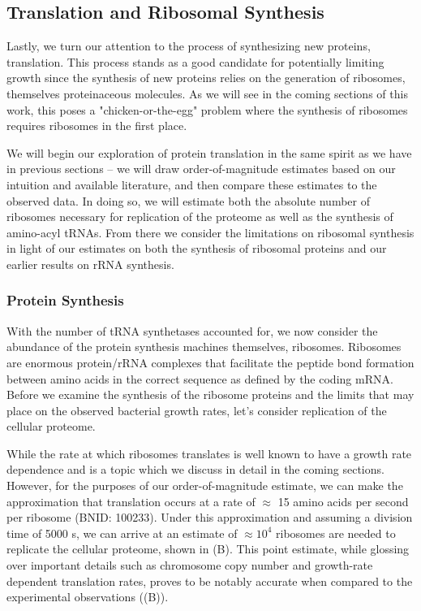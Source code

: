 \subsection{Translation and Ribosomal Synthesis}
Lastly, we turn our attention to the process of synthesizing new proteins,
translation. This process stands as a good candidate for potentially limiting
growth since the synthesis of new proteins relies on the generation of
ribosomes, themselves proteinaceous molecules. As we will see in the coming
sections of this work, this poses a "chicken-or-the-egg" problem where the
synthesis of ribosomes requires ribosomes in the first place.

We will begin our exploration of protein translation in the same spirit as we
have in previous sections -- we will draw order-of-magnitude estimates based
on our intuition and available literature, and then compare these estimates
to the observed data. In doing so, we will estimate both the absolute number
of ribosomes necessary for replication of the proteome as well as the
synthesis of amino-acyl tRNAs. From there we consider the limitations on
ribosomal synthesis in light of our estimates on both the synthesis of
ribosomal proteins and our earlier results on rRNA synthesis.

\subsubsection{Protein Synthesis}
With the number of tRNA synthetases accounted for, we now consider the abundance
of the protein synthesis machines themselves, ribosomes. Ribosomes are enormous
protein/rRNA complexes that facilitate the peptide bond formation between amino
acids in the correct sequence as defined by the coding mRNA. Before we examine
the synthesis of the ribosome proteins and the limits that may place on the
observed bacterial growth rates, let's consider replication of the cellular
proteome.

While the rate at which ribosomes translates is well known to have a growth
rate dependence \cite{dai2018} and is a topic which we discuss in detail in
the coming sections. However, for the purposes of our order-of-magnitude
estimate, we can make the approximation that translation occurs at a rate of
$\approx$ 15 amino acids per second per ribosome (BNID: 100233). Under this
approximation and assuming a division time of 5000 s, we can arrive at an
estimate of $\approx 10^4$ ribosomes are needed to replicate the cellular
proteome, shown in (B). This point estimate, while
glossing over important details such as chromosome copy number and
growth-rate dependent translation rates, proves to be notably accurate when
compared to the experimental observations ((B)).

